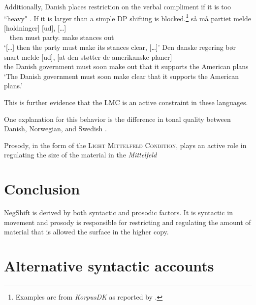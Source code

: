 \documentclass[12pt, letterpaper]{article}
\begin{document}
\ex Additionally, Danish places restriction on the verbal compliment if it is too ``heavy" \citep[44f]{mullerDanishHeadDrivenPhraseInpreparation}. 
	\ea If it is larger than a simple DP shifting is blocked.\footnote{Examples are from \emph{KorpusDK} as reported by \citet{mullerDanishHeadDrivenPhraseInpreparation}.} 
	\ex \gll {[…]} så må partiet melde [holdninger] [ud], {[…]}\\
	~ then must party.\Def{} make stances out\\
	\glt `{[…]} then the party must make its stances clear, {[…]}'
	\ex \gll Den danske regering bør snart melde [ud], [at den støtter de amerikanske planer]\\
	the Danish government must soon make out that it supports the American plans\\
	\glt `The Danish government must soon make clear that it supports the American plans.'
	\z 

\ex This is further evidence that the LMC is an active constraint in these languages. 

\ex One explanation for this behavior is the difference in tonal quality between Danish, Norwegian, and Swedish \citep{erteschik-shirVariationMainlandScandinavian2020}.
\z 

\begin{tcolorbox}[width=\linewidth]

Prosody, in the form of the \textsc{Light Mittelfeld Condition}, plays an active role in regulating the size of the material in the \emph{Mittelfeld}
\end{tcolorbox}
\section{Conclusion} \label{sec:CONCLUSION}

\begin{tcolorbox}[width=\linewidth]
\centering
NegShift is derived by both syntactic and prosodic factors. It is syntactic in movement and prosody is responsible for restricting and regulating the amount of material that is allowed the surface in the higher copy.
\end{tcolorbox}

\section{Alternative syntactic accounts} \label{sec:HNPS}
\end{document}
